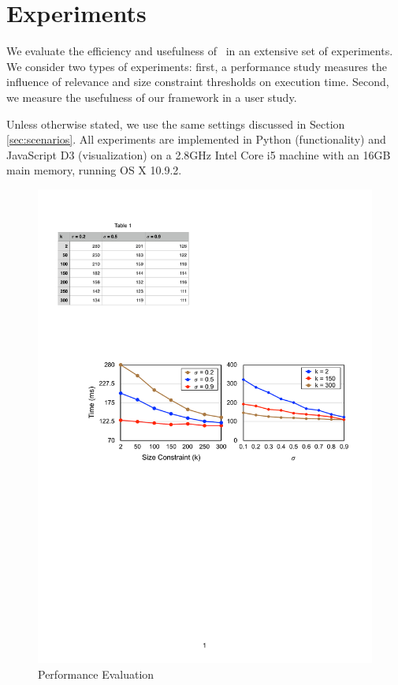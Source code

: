  \section{Experiments}
\label{sec:exp}
We evaluate the efficiency and usefulness of \framework\ in an extensive set of experiments. We consider two types of experiments: first, a performance study measures the influence of relevance and size constraint thresholds on execution time. Second, we measure the usefulness of our framework in a user study.

\vspace{5pt}
 Unless otherwise stated, we use the same settings discussed in Section \ref{sec:scenarios}. All experiments are implemented in Python (functionality) and JavaScript D3 (visualization) on a 2.8GHz Intel Core i5 machine with an 16GB main memory, running OS X 10.9.2.

\begin{figure}
 \centering
 \includegraphics[width=\columnwidth]{figs/performance}
\caption{Performance Evaluation}
\vspace{-10pt}
\label{fig:performance}
\end{figure}

